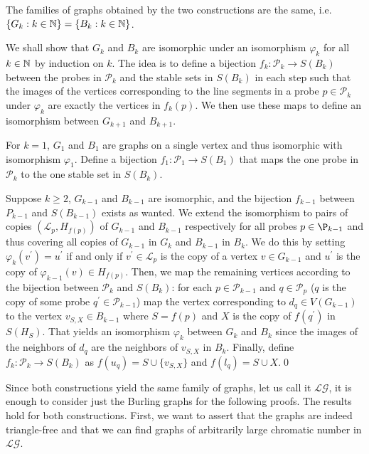 \begin{lemma}
The families of graphs obtained by the two constructions are the same, i.e. $\lbrace G_k :k\in\mathbb{N}\rbrace=\lbrace B_k :k\in\mathbb{N}\rbrace$. 
\end{lemma}
\begin{prf}
We shall show that $G_k$ and $B_k$ are isomorphic under an isomorphism $\varphi_k$ for all $k\in\mathbb{N}$ by induction on $k$. The idea is to define a bijection $f_k:\mathcal{P}_k\to S(B_k)$ between the probes in $\mathcal{P}_k$ and the stable sets in $S(B_k)$ in each step such that the images of the vertices corresponding to the line segments in a probe $p\in\mathcal{P}_k$ under $\varphi_k$ are exactly the vertices in $f_k(p)$. We then use these maps to define an isomorphism between $G_{k+1}$ and $B_{k+1}$.

For $k=1$, $G_1$ and $B_1$ are graphs on a single vertex and thus isomorphic with isomorphism $\varphi_1$. Define a bijection $f_1:\mathcal{P}_1\to S(B_1)$ that maps the one probe in $\mathcal{P}_k$ to the one stable set in $S(B_k)$.

Suppose $k\geq 2$, $G_{k-1}$ and $B_{k-1}$ are isomorphic, and the bijection $f_{k-1}$ between $P_{k-1}$ and $S(B_{k-1})$ exists as wanted. We extend the isomorphism to pairs of copies $(\mathcal{L}_p, H_{f(p)})$ of $G_{k-1}$ and $B_{k-1}$ respectively for all probes $p\in\P_{k-1}$ and thus covering all copies of $G_{k-1}$ in $G_k$ and $B_{k-1}$ in $B_{k}$. We do this by setting $\varphi_k (v^\prime)=u^\prime$ if and only if $v^\prime\in \mathcal{L}_p$ is the copy of a vertex $v\in G_{k-1}$ and $u^\prime$ is the copy of $\varphi_{k-1}(v)\in H_{f(p)}$. Then, we map the remaining vertices according to the bijection between $\mathcal{P}_k$ and $S(B_k)$: for each $p\in\mathcal{P}_{k-1}$ and $q\in\mathcal{P}_p$ ($q$ is the copy of some probe $q^\prime\in\mathcal{P}_{k-1}$) map the vertex corresponding to $d_q\in V(G_{k-1})$ to the vertex $v_{S,X}\in B_{k-1}$ where $S=f(p)$ and $X$ is the copy of $f(q^\prime)$ in $S(H_S)$. That yields an isomorphism $\varphi_k$ between $G_k$ and $B_k$ since the images of the neighbors of $d_q$ are the neighbors of $v_{S,X}$ in $B_k$. Finally, define $f_k:\mathcal{P}_k\to S(B_k)$ as $f(u_q)= S\cup \lbrace v_{S,X}\rbrace$ and $f(l_q)= S\cup X$.\qed
\end{prf}

Since both constructions yield the same family of graphs, let us call it $\mathcal{LG}$, it is enough to consider just the Burling graphs for the following proofs. The results hold for both constructions. First, we want to assert that the graphs are indeed triangle-free and that we can find graphs of arbitrarily large chromatic number in $\mathcal{LG}$.


